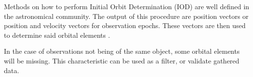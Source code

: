 	Methods on how to perform Initial Orbit Determination (IOD) are well defined in the astronomical community. The output of this procedure are position vectors or position and velocity vectors for observation epochs. These vectors are then used to determine said orbital elements \citep{montenbruck2005satellite}.
	
	In the case of observations not being of the same object, some orbital elements will be missing. This characteristic can be used as a filter, or validate gathered data.
